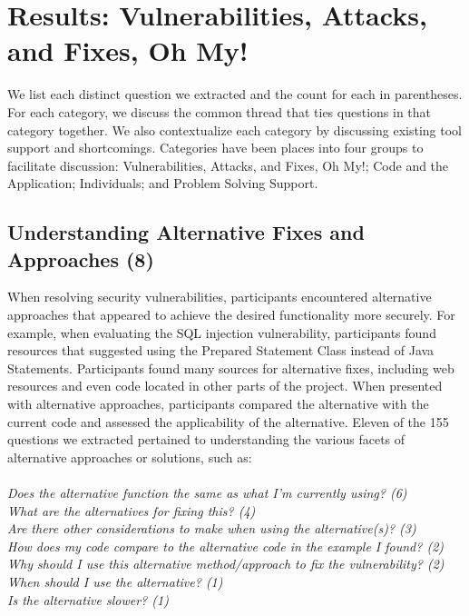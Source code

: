\documentclass[conference]{IEEEtran}
\begin{document}
\section{Results: Vulnerabilities, Attacks, and Fixes, Oh My!}
\label{sec:results-vaf}
We list each distinct question we extracted and the count for each in parentheses. For each category, we discuss the common thread that ties questions in that category together. 
We also contextualize each category by discussing existing tool support and shortcomings.
Categories have been places into four groups to facilitate discussion: Vulnerabilities, Attacks, and Fixes, Oh My!; Code and the Application; Individuals; and Problem Solving Support.



\noindent\subsection{\textbf{Understanding Alternative Fixes and Approaches (8)}}\label{uafa}

When resolving security vulnerabilities, participants encountered alternative approaches that appeared to achieve the desired functionality more securely.
For example, when evaluating the SQL injection vulnerability, participants found resources that suggested using the Prepared Statement Class instead of Java Statements. 
Participants found many sources for alternative fixes, including web resources and even code located in other parts of the project.
When presented with alternative approaches, participants compared the alternative with the current code and assessed the applicability of the alternative. 
Eleven of the 155 questions we extracted pertained to understanding the various facets of alternative approaches or solutions, such as:
\\
\\
\noindent\emph{Does the alternative function the same as what I'm currently using? (6)} \\
\emph{What are the alternatives for fixing this? (4)} \\
\emph{Are there other considerations to make when using the alternative(s)? (3)} \\
\emph{How does my code compare to the alternative code in the example I found? (2)}
\emph{Why should I use this alternative method/approach to fix the vulnerability? (2)} \\
\emph{When should I use the alternative? (1)} \\
\emph{Is the alternative slower? (1)} \\
\end{document}
